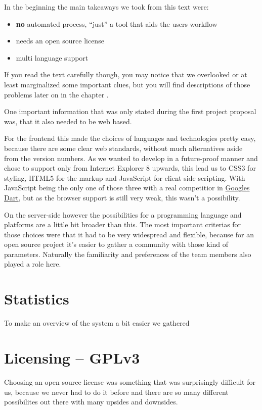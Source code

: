 In the beginning the main takeaways we took from this text were:

\begin{itemize}
\item \textbf{no} automated process, \enquote{just} a tool that aids the users workflow
\item needs an open source license
\item multi language support
\end{itemize}

If you read the text carefully though, you may notice that we 
overlooked or at least marginalized some important clues, but you 
will find descriptions of those problems later on in the chapter .

One important information that was only stated during the first project proposal was, that it also needed to be web based.

For the frontend this made the choices of languages and technologies pretty easy, because there are some clear web standards, without much alternatives aside from the version numbers. As we wanted to develop in a future-proof manner and chose to support only from Internet Explorer 8 upwards, this lead us to CSS3 for styling, HTML5 for the markup and JavaScript for client-side scripting. With JavaScript being the only one of those three with a real competitior in \href{http://www.dartlang.org/}{Googles Dart}, but as the browser support is still very weak, 
this wasn't a possibility.

On the server-side however the possibilities for a programming language and platforms are a little bit broader than this. The most
important criterias for those choices were that it had to be very widespread and flexible, because for
an open source project it's easier to gather a community with those kind of parameters. Naturally the familiarity and preferences of the team members also played a role here.

\section{Statistics}

To make an overview of the system a bit easier we gathered

\section{Licensing -- GPLv3}

Choosing an open source license was something that was surprisingly difficult for us,
because we never had to do it before and there are so many different possibilites out there with many upsides and downsides.

